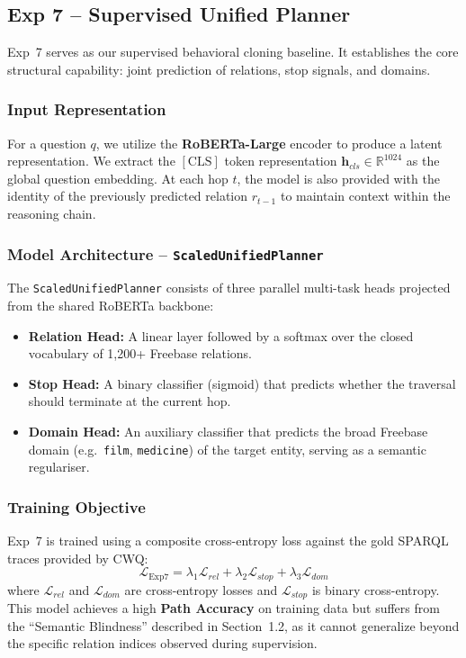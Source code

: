 \documentclass[11pt,a4paper]{article}
\begin{document}
\subsection{Exp 7 -- Supervised Unified Planner}
\label{sec:exp7}

Exp~7 serves as our supervised behavioral cloning baseline. It establishes
the core structural capability: joint prediction of relations, stop signals,
and domains.

\subsubsection{Input Representation}
For a question $q$, we utilize the \textbf{RoBERTa-Large} encoder to produce
a latent representation. We extract the $[\mathrm{CLS}]$ token representation
$\mathbf{h}_{cls} \in \mathbb{R}^{1024}$ as the global question embedding.
At each hop $t$, the model is also provided with the identity of the
previously predicted relation $r_{t-1}$ to maintain context within the
reasoning chain.

\subsubsection{Model Architecture -- \texttt{ScaledUnifiedPlanner}}
The \texttt{ScaledUnifiedPlanner} consists of three parallel multi-task heads
projected from the shared RoBERTa backbone:
\begin{itemize}
    \item \textbf{Relation Head:} A linear layer followed by a softmax over
          the closed vocabulary of 1,200+ Freebase relations.
    \item \textbf{Stop Head:} A binary classifier (sigmoid) that predicts
          whether the traversal should terminate at the current hop.
    \item \textbf{Domain Head:} An auxiliary classifier that predicts the
          broad Freebase domain (e.g.\ \texttt{film}, \texttt{medicine}) of
          the target entity, serving as a semantic regulariser.
\end{itemize}

\subsubsection{Training Objective}
Exp~7 is trained using a composite cross-entropy loss against the gold
SPARQL traces provided by CWQ:
\begin{equation}
    \mathcal{L}_{\text{Exp7}} = \lambda_1 \mathcal{L}_{rel} + 
                                \lambda_2 \mathcal{L}_{stop} + 
                                \lambda_3 \mathcal{L}_{dom}
\end{equation}
where $\mathcal{L}_{rel}$ and $\mathcal{L}_{dom}$ are cross-entropy losses
and $\mathcal{L}_{stop}$ is binary cross-entropy.
This model achieves a high \textbf{Path Accuracy} on training data but
suffers from the ``Semantic Blindness'' described in Section~1.2, as it
cannot generalize beyond the specific relation indices observed during
supervision.
\end{document}
